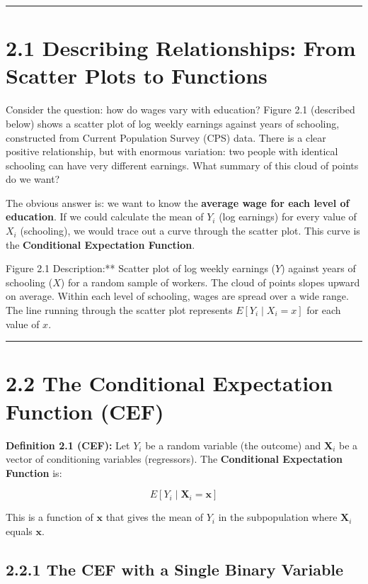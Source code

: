 \medskip\hrule\medskip

\section{2.1 Describing Relationships: From Scatter Plots to Functions}

Consider the question: how do wages vary with education? Figure 2.1 (described below) shows a scatter plot of log weekly earnings against years of schooling, constructed from Current Population Survey (CPS) data. There is a clear positive relationship, but with enormous variation: two people with identical schooling can have very different earnings. What summary of this cloud of points do we want?

The obvious answer is: we want to know the \textbf{average wage for each level of education}. If we could calculate the mean of $Y_i$ (log earnings) for every value of $X_i$ (schooling), we would trace out a curve through the scatter plot. This curve is the \textbf{Conditional Expectation Function}.

\begin{keybox}{Figure 2.1 Description:** Scatter plot of log weekly earnings ($Y$) against years of schooling ($X$) for a random sample of workers. The cloud of points slopes upward on average. Within each level of schooling, wages are spread over a wide range. The line running through the scatter plot represents $E[Y_i \mid X_i = x]$ for each value of $x$.}
\end{keybox}

\medskip\hrule\medskip

\section{2.2 The Conditional Expectation Function (CEF)}

\textbf{Definition 2.1 (CEF):} Let $Y_i$ be a random variable (the outcome) and $\mathbf{X}_i$ be a vector of conditioning variables (regressors). The \textbf{Conditional Expectation Function} is:

\[
E[Y_i \mid \mathbf{X}_i = \mathbf{x}]
\]

This is a function of $\mathbf{x}$ that gives the mean of $Y_i$ in the subpopulation where $\mathbf{X}_i$ equals $\mathbf{x}$.

\subsection{2.2.1 The CEF with a Single Binary Variable}


